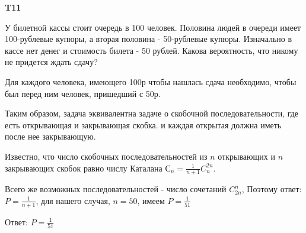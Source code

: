 \documentclass[a4paper,12pt]{article} %
\begin{document}
\begin{example}\textbf{T11}

У билетной кассы стоит очередь в 100 человек. Половина людей в очереди имеет 100-рублевые купюры, а вторая половина - 50-рублевые купюры. 
Изначально в кассе нет денег и стоимость билета - 50 рублей. 
Какова вероятность, что никому не придется ждать сдачу?

Для каждого человека, имеющего 100р чтобы нашлась сдача необходимо, чтобы был перед ним человек, пришедший с 50р.


Таким образом, задача эквивалентна задаче о скобочной последовательности, где есть открывающая и закрывающая скобка. и каждая открытая должна иметь после нее закрывающую.


Известно, что число скобочных последовательностей из $ n$ открывающих и $ n$ закрывающих скобок равно числу Каталана $С_n = \frac{1}{n+1}C_n^{2n}$.

Всего же возможных последовательностей - число сочетаний $ C_{2n}^n$, Поэтому ответ: $P= \frac{1}{n+1}$, для нашего случая, $ n=50$, имеем $P= \frac{1}{51}$


Ответ: $P= \frac{1}{51}$


\end{example}
\end{document}

